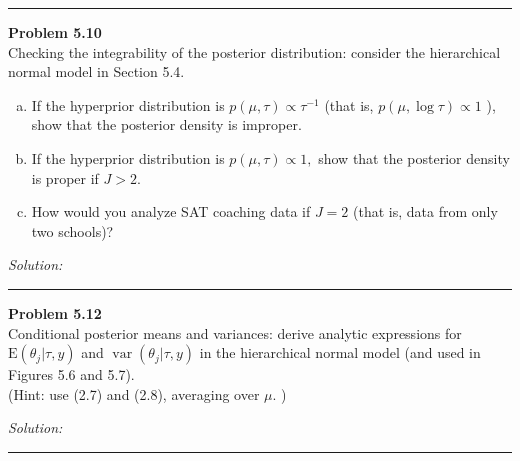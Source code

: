 \documentclass[a4paper, 11pt]{article}
\newenvironment{problem}[2][Problem]
    { \begin{mdframed}[backgroundcolor=gray!20] \textbf{#1 #2} \\}
    {  \end{mdframed}}
\newenvironment{solution}
    {\textit{Solution:}}
    {}
\begin{document}
\noindent\rule{7in}{2.8pt}
\begin{problem}{5.10}
  Checking the integrability of the posterior distribution: consider the hierarchical normal
  model in Section 5.4.
  \begin{enumerate}[(a)]
    \item  If the hyperprior distribution is $p(\mu, \tau) \propto \tau^{-1}$ (that is, $p(\mu, \log \tau) \propto 1$ ), show that the posterior density is improper.
    \item If the hyperprior distribution is $p(\mu, \tau) \propto 1,$ show that the posterior density is proper
    if $J>2$.
    \item  How would you analyze SAT coaching data if $J=2$ (that is, data from only two schools)?
  \end{enumerate}
\end{problem}
\begin{solution}

\end{solution}

\noindent\rule{7in}{2.8pt}
\begin{problem}{5.12}
  Conditional posterior means and variances: derive analytic expressions for $\mathrm{E}\left(\theta_{j} | \tau, y\right)$ and $\operatorname{var}\left(\theta_{j} | \tau, y\right)$  in the hierarchical normal model (and used in Figures 5.6  and  5.7).\\
   (Hint:  use (2.7) and (2.8), averaging over $\mu .$ )
\end{problem}
\begin{solution}

\end{solution}

\noindent\rule{7in}{2.8pt}

\end{document}
